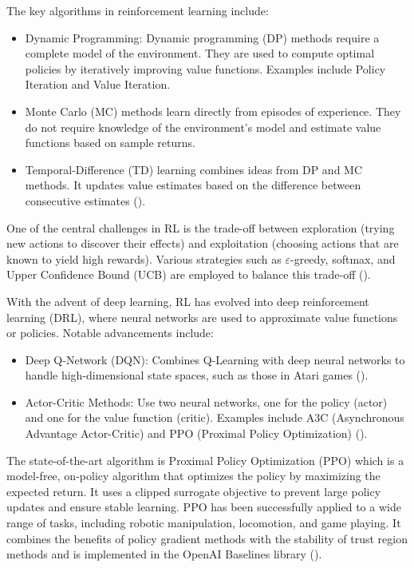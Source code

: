 The key algorithms in reinforcement learning include:
\begin{itemize}
    \item Dynamic Programming: Dynamic programming (DP) methods require a complete model of the environment. They are used to compute optimal policies by iteratively improving value functions. Examples include Policy Iteration and Value Iteration.
    \item Monte Carlo (MC) methods learn directly from episodes of experience. They do not require knowledge of the environment's model and estimate value functions based on sample returns.
    \item Temporal-Difference (TD) learning combines ideas from DP and MC methods. It updates value estimates based on the difference between consecutive estimates (\cite{sutton_reinforcement_2018}).
\end{itemize}

One of the central challenges in RL is the trade-off between exploration (trying new actions to discover their effects) and exploitation (choosing actions that are known to yield high rewards). Various strategies such as $\varepsilon$-greedy, softmax, and Upper Confidence Bound (UCB) are employed to balance this trade-off (\cite{auer_finite-time_2002}).

With the advent of deep learning, RL has evolved into deep reinforcement learning (DRL), where neural networks are used to approximate value functions or policies. Notable advancements include:
\begin{itemize}
    \item Deep Q-Network (DQN): Combines Q-Learning with deep neural networks to handle high-dimensional state spaces, such as those in Atari games (\cite{mnih_human-level_2015}).
    \item Actor-Critic Methods: Use two neural networks, one for the policy (actor) and one for the value function (critic). Examples include A3C (Asynchronous Advantage Actor-Critic) and PPO (Proximal Policy Optimization) (\cite{mnih_asynchronous_2016,schulman_proximal_2017}).
\end{itemize}

The state-of-the-art algorithm is Proximal Policy Optimization (PPO) which is a model-free, on-policy algorithm that optimizes the policy by maximizing the expected return. It uses a clipped surrogate objective to prevent large policy updates and ensure stable learning. PPO has been successfully applied to a wide range of tasks, including robotic manipulation, locomotion, and game playing. It combines the benefits of policy gradient methods with the stability of trust region methods and is implemented in the OpenAI Baselines library (\cite{schulman_proximal_2017,openai_proximal_2017,wouter_van_heeswijk_proximal_2023}).

